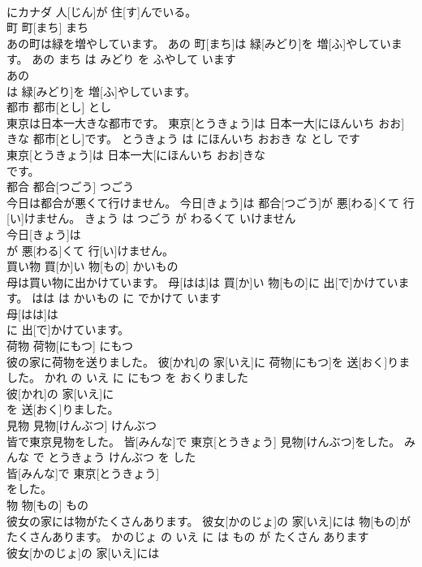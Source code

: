 \documentclass[8pt]{extreport}
\begin{document}
\begin{CJK}{UTF8}{min}
\\	にカナダ 人[じん]が 住[す]んでいる。			
\\	町	町[まち]	まち	
\\	あの町は緑を増やしています。	あの 町[まち]は 緑[みどり]を 増[ふ]やしています。	あの まち は みどり を ふやして います	
\\	あの
\\	は 緑[みどり]を 増[ふ]やしています。			
\\	都市	都市[とし]	とし	
\\	東京は日本一大きな都市です。	東京[とうきょう]は 日本一大[にほんいち おお]きな 都市[とし]です。	とうきょう は にほんいち おおき な とし です	
\\	東京[とうきょう]は 日本一大[にほんいち おお]きな
\\	です。			
\\	都合	都合[つごう]	つごう	
\\	今日は都合が悪くて行けません。	今日[きょう]は 都合[つごう]が 悪[わる]くて 行[い]けません。	きょう は つごう が わるくて いけません	
\\	今日[きょう]は
\\	が 悪[わる]くて 行[い]けません。			
\\	買い物	買[か]い 物[もの]	かいもの	
\\	母は買い物に出かけています。	母[はは]は 買[か]い 物[もの]に 出[で]かけています。	はは は かいもの に でかけて います	
\\	母[はは]は
\\	に 出[で]かけています。			
\\	荷物	荷物[にもつ]	にもつ	
\\	彼の家に荷物を送りました。	彼[かれ]の 家[いえ]に 荷物[にもつ]を 送[おく]りました。	かれ の いえ に にもつ を おくりました	
\\	彼[かれ]の 家[いえ]に
\\	を 送[おく]りました。			
\\	見物	見物[けんぶつ]	けんぶつ	
\\	皆で東京見物をした。	皆[みんな]で 東京[とうきょう] 見物[けんぶつ]をした。	みんな で とうきょう けんぶつ を した	
\\	皆[みんな]で 東京[とうきょう]
\\	をした。			
\\	物	物[もの]	もの	
\\	彼女の家には物がたくさんあります。	彼女[かのじょ]の 家[いえ]には 物[もの]がたくさんあります。	かのじょ の いえ に は もの が たくさん あります	
\\	彼女[かのじょ]の 家[いえ]には

\end{CJK}
\end{document}
